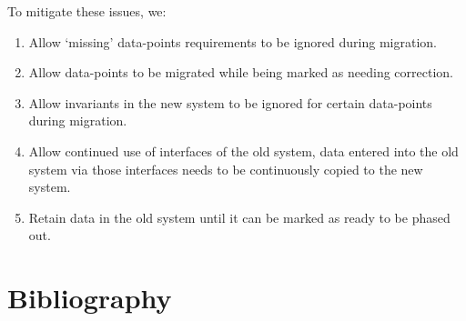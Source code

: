 \documentclass{elsarticle}
\begin{document}
	To mitigate these issues, we:
	
	\begin{enumerate}
	\item Allow `missing' data-points requirements to be ignored during migration.
	\item Allow data-points to be migrated while being marked as needing correction.
	\item Allow invariants in the new system to be ignored for certain data-points during migration.
	\item Allow continued use of interfaces of the old system, data entered into the old system via those interfaces needs to be continuously copied to the new system.
	\item Retain data in the old system until it can be marked as ready to be phased out.
	\end{enumerate}	

\section{Bibliography}


\end{document}
